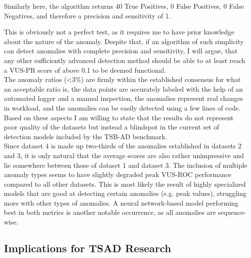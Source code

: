 \documentclass[12pt,oneside]{article}
\begin{document}
\par
Similarly here, the algorithm returns 40 True Positives, 0 False Positives, 0 False Negatives, and therefore a precision and sensitivity of 1. \par
This is obviously not a perfect test, as it requires me to have prior knowledge about the nature of the anomaly. Despite that, if an algorithm of such simplicity can detect anomalies with complete precision and sensitivity, I will argue, that any other sufficiently advanced detection method should be able to at least reach a VUS-PR score of above 0.1 to be deemed functional.\\
The anomaly ratios (<3\%) are firmly within the established consensus for what an acceptable ratio is, the data points are accurately labeled with the help of an automated logger and a manual inspection, the anomalies represent real changes in workload, and the anomalies can be easily detected using a few lines of code. Based on these aspects I am willing to state that the results do not represent poor quality of the datasets but instead a blindspot in the current set of detection models included by the TSB-AD benchmark. \\
Since dataset 4 is made up two-thirds of the anomalies established in datasets 2 and 3, it is only natural that the average scores are also rather unimpressive and lie somewhere between those of dataset 1 and dataset 3. The inclusion of multiple anomaly types seems to have slightly degraded peak VUS-ROC performance compared to all other datasets. This is most likely the result of highly specialized models that are good at detecting certain anomalies (e.g. peak values), struggling more with other types of anomalies. A neural network-based model performing best in both metrics is another notable occurrence, as all anomalies are sequence-wise.

\subsection{Implications for TSAD Research}
\end{document}
